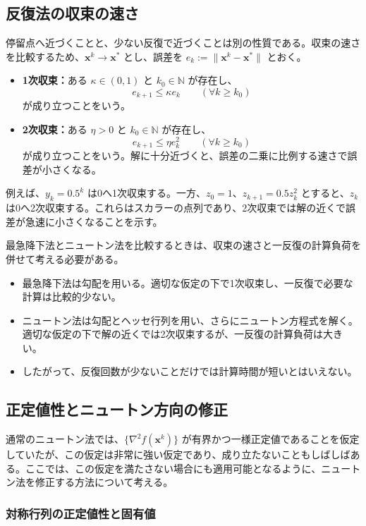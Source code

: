 \documentclass[a4j]{jarticle}
\begin{document}
\subsection{反復法の収束の速さ}
\label{sec:convergence-rate}
停留点へ近づくことと、少ない反復で近づくことは別の性質である。収束の速さを比較するため、$\bm{x}^k\to\bm{x}^*$ とし、誤差を $e_k:=\|\bm{x}^k-\bm{x}^*\|$ とおく。
\begin{itemize}
  \item \textbf{1次収束：}ある $\kappa\in(0,1)$ と $k_0\in\mathbb{N}$ が存在し、
  \[
    e_{k+1}\le\kappa e_k\qquad(\forall k\ge k_0)
  \]
  が成り立つことをいう。
  \item \textbf{2次収束：}ある $\eta>0$ と $k_0\in\mathbb{N}$ が存在し、
  \[
    e_{k+1}\le\eta e_k^2\qquad(\forall k\ge k_0)
  \]
  が成り立つことをいう。解に十分近づくと、誤差の二乗に比例する速さで誤差が小さくなる。
\end{itemize}

例えば、$y_k=0.5^k$ は0へ1次収束する。一方、$z_0=1$、$z_{k+1}=0.5z_k^2$ とすると、$z_k$ は0へ2次収束する。これらはスカラーの点列であり、2次収束では解の近くで誤差が急速に小さくなることを示す。

最急降下法とニュートン法を比較するときは、収束の速さと一反復の計算負荷を併せて考える必要がある。
\begin{itemize}
  \item 最急降下法は勾配を用いる。適切な仮定の下で1次収束し、一反復で必要な計算は比較的少ない。
  \item ニュートン法は勾配とヘッセ行列を用い、さらにニュートン方程式を解く。適切な仮定の下で解の近くでは2次収束するが、一反復の計算負荷は大きい。
  \item したがって、反復回数が少ないことだけでは計算時間が短いとはいえない。
\end{itemize}

\subsection{正定値性とニュートン方向の修正}
\label{sec:newton-modification}
通常のニュートン法では、$\{\nabla^2f(\bm{x}^k)\}$ が有界かつ一様正定値であることを仮定していたが、この仮定は非常に強い仮定であり、成り立たないこともしばしばある。ここでは、この仮定を満たさない場合にも適用可能となるように、ニュートン法を修正する方法について考える。

\subsubsection{対称行列の正定値性と固有値}
\end{document}
